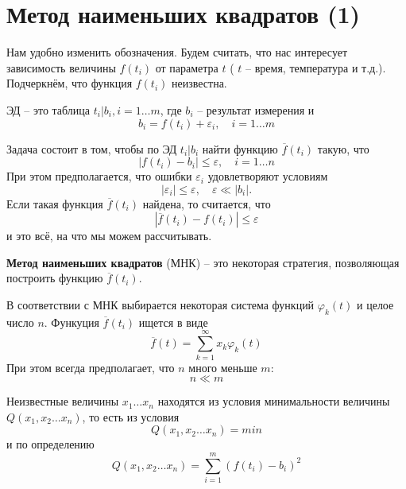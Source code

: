 \section{Метод наименьших квадратов (1)}
\label{lecture5}

Нам удобно изменить обозначения. Будем считать, что нас интересует зависимость величины $f(t_i)$ от параметра  $t$ ( $t$ -- время, температура и т.д.). Подчеркнём, что функция $f(t_i)$ неизвестна.

ЭД -- это таблица $t_i | b_i, i = 1 \dots m$, где $b_i$ -- результат измерения и 
\begin{equation}
	b_i = f(t_i) + \varepsilon_i, \quad i = 1 \dots m
\end{equation}

Задача состоит в том, чтобы по ЭД  $t_i | b_i$ найти функцию $\overline f(t_i)$ такую, что 
\begin{equation}
	|f(t_i) - b_i| \leq \varepsilon, \quad i = 1 \dots n
\end{equation}
При этом предполагается, что ошибки $\varepsilon_i$ удовлетворяют условиям
\begin{equation}
	|\varepsilon_i | \leq \varepsilon , \quad \varepsilon \ll  |b_i| .
\end{equation}
Если такая функция $\overline f(t_i)$ найдена, то считается, что
\begin{equation}
	|\overline f(t_i) - f(t_i) | \leq \varepsilon
\end{equation}
и это всё, на что мы можем рассчитывать.


\textbf{Метод наименьших квадратов} (МНК) --  это некоторая стратегия, позволяющая построить функцию $\overline f(t_i)$.

В соответствии с МНК выбирается некоторая система функций $\varphi_k (t) $ и целое число $n$. Функуция $\overline f(t_i)$ ищется в виде 
\begin{equation} \label{eq:5.5}
	\overline{f} (t) = \sum_{k=1}^{\infty} {x_k \varphi_k (t) }
\end{equation}
При этом всегда предполагает, что $n$ много меньше $m$:
\begin{equation}
	n \ll m
\end{equation}

Неизвестные величины $x_1 \dots x_n$ находятся из условия минимальности величины $Q(x_1, x_2 \dots x_n)$, то есть из условия
\begin{equation} \label{eq:5.7}
	Q(x_1, x_2 \dots x_n) = min
\end{equation}
и по определению
\begin{equation} 
	Q(x_1, x_2 \dots x_n) = \sum_{i=1}^m {(f(t_i) - b_i)^2}
\end{equation}

